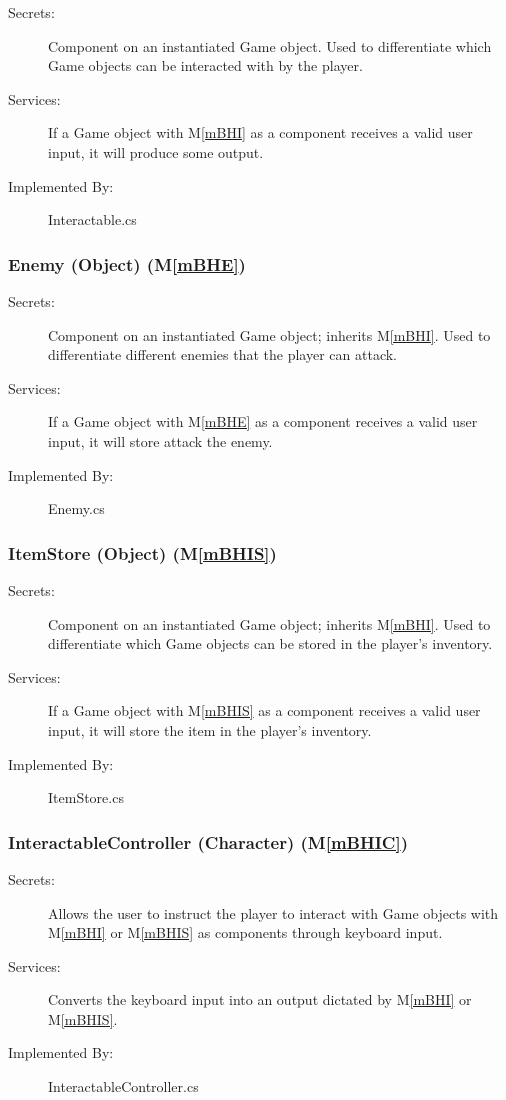 \documentclass[12pt, titlepage]{article}
\newcommand{\mref}[1]{M\ref{#1}}
\begin{document}
\begin{description}
\item[Secrets:] Component on an instantiated Game object. Used to differentiate which Game objects can be interacted with by the player.
\item[Services:] If a Game object with \mref{mBHI} as a component receives a valid user input, it will produce some output. 
\item[Implemented By:] Interactable.cs
\end{description}

\subsubsection{Enemy (Object) (\mref{mBHE})}

\begin{description}
\item[Secrets:] Component on an instantiated Game object; inherits \mref{mBHI}. Used to differentiate different enemies that the player can attack.
\item[Services:] If a Game object with \mref{mBHE} as a component receives a valid user input, it will store attack the enemy.
\item[Implemented By:] Enemy.cs
\end{description}

\subsubsection{ItemStore (Object) (\mref{mBHIS})}

\begin{description}
\item[Secrets:] Component on an instantiated Game object; inherits \mref{mBHI}. Used to differentiate which Game objects can be stored in the player's inventory.
\item[Services:] If a Game object with \mref{mBHIS} as a component receives a valid user input, it will store the item in the player's inventory.
\item[Implemented By:] ItemStore.cs
\end{description}

\subsubsection{InteractableController (Character)  (\mref{mBHIC})}

\begin{description}
\item[Secrets:] Allows the user to instruct the player to interact with Game objects with \mref{mBHI} or \mref{mBHIS} as components through keyboard input.
\item[Services:] Converts the keyboard input into an output dictated by \mref{mBHI} or \mref{mBHIS}.
\item[Implemented By:] InteractableController.cs
\end{description}
\end{document}
